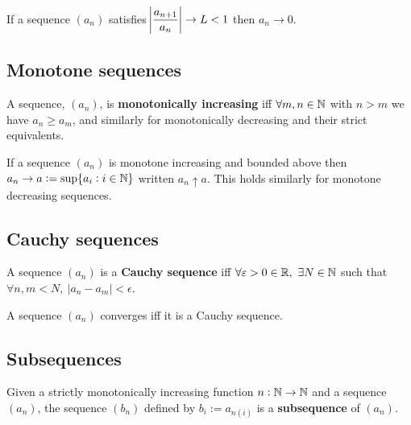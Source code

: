 \documentclass[../Year1.tex]{subfiles}
\begin{document}
\begin{theorem}
    If a sequence $(a_n)$ satisfies $\displaystyle \abs{\frac{a_{n+1}}{a_n}}\rightarrow L <1$ then $a_n\rightarrow0$.
\end{theorem}

\subsection{Monotone sequences}

\begin{definition}
    A sequence, $(a_n)$, is \textbf{monotonically increasing} iff $\forall m,n\in\mathbb{N}$ with $n>m$ we have $a_n\geq a_m$, and similarly for monotonically decreasing and their strict equivalents.
\end{definition}

\begin{theorem}
    If a sequence $(a_n)$ is monotone increasing and bounded above then $a_n\rightarrow a := \sup\{a_i:i\in\mathbb{N}\}$ written $a_n\uparrow a$. This holds similarly for monotone decreasing sequences.
\end{theorem}

\subsection{Cauchy sequences}

\begin{definition}
   A sequence $(a_n)$ is a \textbf{Cauchy sequence} iff $\forall \varepsilon>0\in\mathbb{R}, \ \exists N\in\mathbb{N}$ such that $\forall n,m<N, \ |a_n-a_m|<\epsilon$.
\end{definition}

\begin{theorem}
    A sequence $(a_n)$ converges iff it is a Cauchy sequence.
\end{theorem}

\subsection{Subsequences}

\begin{definition}[Subsequence]
    Given a strictly monotonically increasing function $n:\mathbb{N}\rightarrow\mathbb{N}$ and a sequence $(a_n)$, the  sequence $(b_n)$ defined by $b_i:=a_{n(i)}$ is a \textbf{subsequence} of $(a_n)$.
\end{definition}
\end{document}
